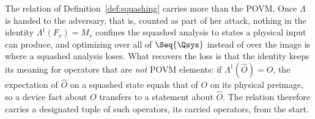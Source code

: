 
\begin{remark}\label{rem:carried-operators}
The relation of Definition~\ref{def:squashing} carries more than the POVM.
Once $\Lambda$ is handed to the adversary, that is, counted as part of her
attack, nothing in the identity
$\Lambda^{\dagger}(F_v)=M_v$ confines the squashed analysis to states a
physical input can produce, and optimizing over all of $\Seq{\Qsys}$ instead
of over the image is where a squashed analysis loses. What recovers the loss
is that the identity keeps its meaning for operators that are \emph{not} POVM
elements: if $\Lambda^{\dagger}(\hat O)=O$, the expectation of $\hat O$ on a
squashed state equals that of $O$ on its physical preimage, so a device fact
about $O$ transfers to a statement about $\hat O$. The relation therefore
carries a designated tuple of such operators, its carried operators, from the
start.
\end{remark}
